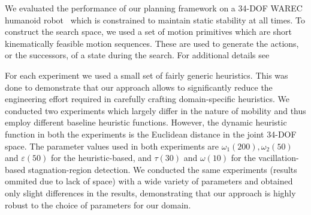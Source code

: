 \documentclass{article}
\begin{document}
We evaluated the performance of our planning framework on a 34-DOF WAREC humanoid robot~\cite{MHSetal15} 
which is constrained to maintain static stability at all times. 
%
To construct the search space, we used a set of motion primitives which are short kinematically feasible motion sequences. 
These are used to generate the actions, or the successors, of a state during the search. 
For additional details see~\cite{DL18}


For each experiment we used a small set of fairly generic heuristics. 
This was done to demonstrate that our approach allows to significantly reduce the engineering effort required in carefully crafting domain-specific heuristics. 
We conducted two experiments which largely differ in the nature of mobility and thus employ different baseline heuristic functions. 
However, the dynamic heuristic function in both the experiments is the Euclidean distance in the joint 34-DOF space.
The parameter values used in both experiments are $\omega_1 (200), \omega_2 (50)$ and $\varepsilon (50)$ for the heuristic-based, and $\tau (30)$ and $\omega (10)$ for the vacillation-based stagnation-region detection.
We conducted the same experiments (results ommited due to lack of space) with a wide variety of parameters and obtained  only slight differences in the results, demonstrating that our approach is highly robust to the choice of parameters for our domain.
\end{document}
